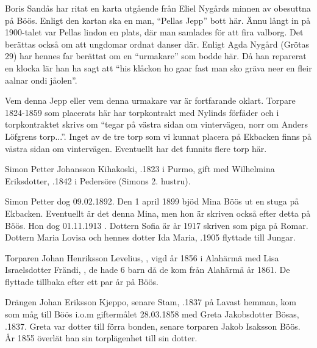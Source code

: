 
Boris Sandås har ritat en karta utgående från Eliel Nygårds minnen av obesuttna på Böös. Enligt den kartan ska en man, ``Pellas Jepp'' bott här. Ännu långt in på 1900-talet var Pellas lindon en plats, där man samlades för att fira valborg. Det berättas också om att ungdomar ordnat danser där. Enligt Agda Nygård (Grötas 29) har hennes far berättat om en ``urmakare'' som bodde här. Då han reparerat en klocka lär han ha sagt att ``his klåckon ho gaar fast man sko gräva neer en fleir 	aalnar ondi jåolen''.

Vem denna Jepp eller vem denna urmakare var är fortfarande oklart. Torpare 1824-1859 som placerats här har torpkontrakt med Nylinds förfäder och i torpkontraktet skrivs om ``tegar på västra sidan om 	vintervägen, norr om Anders Löfgrens torp...''. Inget av de tre torp som vi kunnat placera på Ekbacken finns på västra sidan om 	vintervägen. Eventuellt har det funnits flere torp här.


Simon Petter Johansson Kihakoski, .1823 i Purmo, gift med Wilhelmina Eriksdotter, .1842 i Pedersöre (Simons 2. hustru).
\begin{jhchildren}
  \item {}
  \item {}
  \item {}
  \item {}
  \item {}
\end{jhchildren}
Simon Petter dog 09.02.1892. Den 1 april 1899 bjöd Mina Böös ut en stuga på Ekbacken. Eventuellt är det denna Mina, men hon är skriven också efter detta på Böös. Hon dog 01.11.1913 . Dottern Sofia är år 1917 skriven som piga på Romar. Dottern Maria Lovisa och hennes dotter Ida Maria, .1905 flyttade till Jungar.


Torparen Johan Henriksson Levelius, , vigd år 1856 i Alahärmä med Lisa Israelsdotter Frändi, , de hade 6 barn då de kom från Alahärmä år 1861. De flyttade tillbaka efter ett par år på Böös.


Drängen Johan Eriksson Kjeppo, senare Stam, .1837 på Lavast hemman, kom som måg till Böös i.o.m giftermålet 28.03.1858 med Greta Jakobsdotter Bösas, .1837. Greta var dotter till förra bonden, senare torparen Jakob Isaksson Böös. År 1855 överlät han sin torplägenhet till sin dotter.

